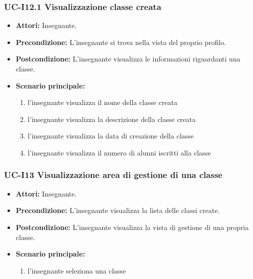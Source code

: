 \subsubsection{UC-I12.1 Visualizzazione classe creata}		
\begin{itemize}
	\item \textbf{Attori:} Insegnante.
	\item \textbf{Precondizione:} L'insegnante si trova nella vista del proprio profilo.
	\item \textbf{Postcondizione:} L'insegnante visualizza le informazioni riguardanti una classe.
	\item \textbf{Scenario principale:}
	\begin{enumerate}
		\item l'insegnante visualizza il nome della classe creata
		\item l'insegnante visualizza la descrizione della classe creata
		\item l'insegnante visualizza la data di creazione della classe
		\item l'insegnante visualizza il numero di alunni iscritti alla classe
	\end{enumerate}		
\end{itemize}

\subsubsection{UC-I13 Visualizzazione area di gestione di una classe}
\begin{itemize}
	\item \textbf{Attori:} Insegnante.
	\item \textbf{Precondizione:} L'insegnante visualizza la lista delle classi create.
	\item \textbf{Postcondizione:} L'insegnante visualizza la vista di gestione di una propria classe.
	\item \textbf{Scenario principale:}
	\begin{enumerate}
		\item l'insegnante seleziona una classe
	\end{enumerate}
\end{itemize}

